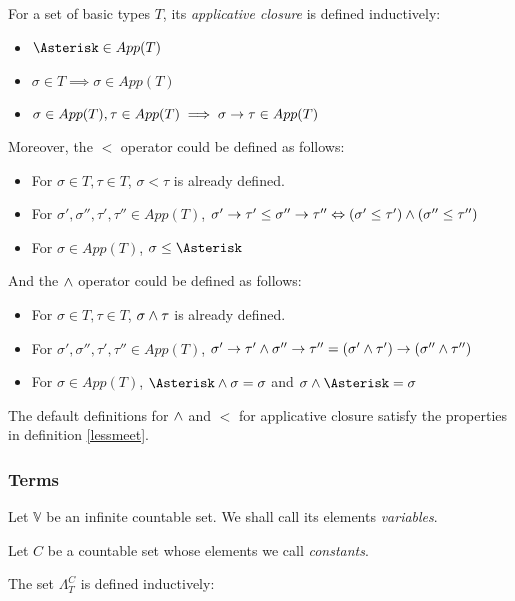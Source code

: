 \documentclass[main.tex]{subfiles}
\begin{document}
\begin{defn}
    For a set of basic types $T$, its \emph{applicative closure} is defined inductively:
    \begin{itemize}
        \item $\wildcard \in App(T)$
        \item $\sigma \in T \implies \sigma \in App(T)$
        \item $\sigma \in App(T), \tau \in App(T) \implies \sigma \rightarrow \tau \in App(T)$
    \end{itemize}

    Moreover, the $\less$ operator could be defined as follows:
    \begin{itemize}
        \item For $\sigma \in T, \tau \in T$, $\sigma \less \tau$ is already defined.
        \item For $\sigma', \sigma'', \tau', \tau'' \in App(T)$,
                  $\sigma' \rightarrow \tau' \leq \sigma'' \rightarrow \tau''
                  \Leftrightarrow (\sigma' \leq \tau') \land (\sigma'' \leq \tau'')$
        \item For $\sigma \in App(T)$, $\sigma \less \wildcard$
    \end{itemize}


    And the $\wedge$ operator could be defined as follows:
    \begin{itemize}
        \item For $\sigma \in T, \tau \in T$, $\sigma \wedge \tau$ is already defined.
        \item For $\sigma', \sigma'', \tau', \tau'' \in App(T)$,
                  $\sigma' \rightarrow \tau' \wedge \sigma'' \rightarrow \tau''
                  = (\sigma' \wedge \tau') \rightarrow (\sigma'' \wedge \tau'')$
        \item For $\sigma \in App(T)$, $\wildcard \meet \sigma = \sigma$
                                   and $\sigma \meet \wildcard = \sigma$
    \end{itemize}

\end{defn}

\begin{prop}
    The default definitions for $\wedge$ and $\less$ for applicative closure
    satisfy the properties in definition \ref{lessmeet}.
\end{prop}

\subsubsection{Terms}
\begin{defn}
    Let $\mathbb{V}$ be an infinite countable set. We shall call its elements
    \emph{variables}.
\end{defn}

\begin{defn}
    Let $C$ be a countable set whose elements we call \emph{constants}.

    The set $\Lambda_T^C$ is defined inductively:

\end{defn}
\end{document}
